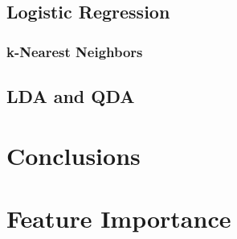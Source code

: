 \documentclass{article}
\begin{document}
\subsection{Logistic Regression}



\subsubsection{k-Nearest Neighbors}

\subsection{LDA and QDA}

\section{Conclusions}

\section{Feature Importance}
\end{document}

